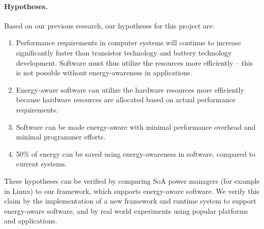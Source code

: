 \documentclass{article}
\begin{document}
\paragraph{Hypotheses.}
Based on our previous research, our hypotheses for this project are:
\begin{enumerate}
 \item Performance requirements in computer systems will continue to increase significantly faster than transistor technology and battery technology development. 
 Software must thus utilize the resources more efficiently -- this is not possible without energy-awareness in applications.  \vspace{-0.2cm}
 \item Energy-aware software can utilize the hardware resources more efficiently because hardware resources are allocated based on actual performance requirements.\vspace{-0.2cm}
 \item Software can be made energy-aware with minimal performance overhead and minimal programmer efforts.\vspace{-0.2cm}
 \item 50\% of energy can be saved using energy-awareness in software, compared to current systems.
\end{enumerate}
These hypotheses can be verified by comparing SoA power managers (for example in Linux) to our framework, which supports energy-aware software.
We verify this claim by the implementation of a new framework and runtime system to support energy-aware software, and by real world experiments using popular platforms and applications.
\end{document}
